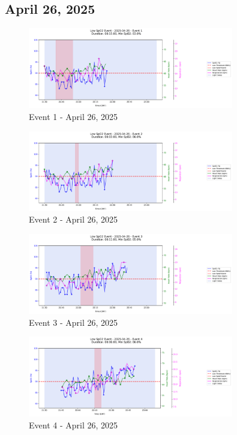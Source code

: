 \documentclass{article}
\begin{document}
\subsection{April 26, 2025}
\begin{figure}[htbp]
    \centering
    \includegraphics[width=0.8\textwidth]{images/2025-04-26_event_1.png}
    \caption{Event 1 - April 26, 2025}
\end{figure}
\begin{figure}[htbp]
    \centering
    \includegraphics[width=0.8\textwidth]{images/2025-04-26_event_2.png}
    \caption{Event 2 - April 26, 2025}
\end{figure}
\begin{figure}[htbp]
    \centering
    \includegraphics[width=0.8\textwidth]{images/2025-04-26_event_3.png}
    \caption{Event 3 - April 26, 2025}
\end{figure}
\begin{figure}[htbp]
    \centering
    \includegraphics[width=0.8\textwidth]{images/2025-04-26_event_4.png}
    \caption{Event 4 - April 26, 2025}
\end{figure}
\clearpage
\end{document}
